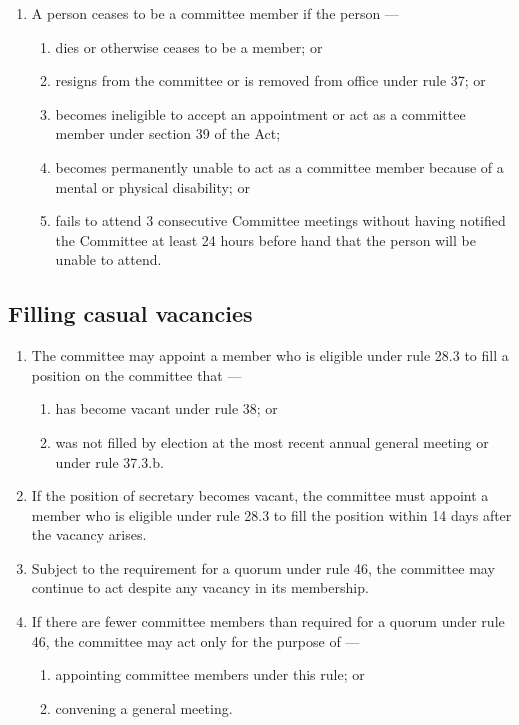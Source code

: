 \documentclass[../constitution.tex]{subfiles}
\begin{document}
\begin{enumerate}

\item A person ceases to be a committee member if the person ---

  \begin{enumerate}
  
  \item dies or otherwise ceases to be a member; or
  \item resigns from the committee or is removed from office under rule 37; or
  \item becomes ineligible to accept an appointment or act as a committee member under section 39 of the Act;
  \item becomes permanently unable to act as a committee member because of a mental or physical disability; or
  \item fails to attend 3 consecutive Committee meetings without having notified the Committee at least 24 hours before hand that the person will be unable to attend.
  \end{enumerate}
\end{enumerate}

\hypertarget{filling-casual-vacancies}{%
\subsection{Filling casual vacancies}\label{filling-casual-vacancies}}

\begin{enumerate}

\item The committee may appoint a member who is eligible under rule 28.3 to fill a position on the committee that ---

  \begin{enumerate}
  
  \item has become vacant under rule 38; or
  \item was not filled by election at the most recent annual general meeting or under rule 37.3.b.
  \end{enumerate}
\item If the position of secretary becomes vacant, the committee must appoint a member who is eligible under rule 28.3 to fill the position within 14 days after the vacancy arises.
\item Subject to the requirement for a quorum under rule 46, the committee may continue to act despite any vacancy in its membership.
\item If there are fewer committee members than required for a quorum under rule 46, the committee may act only for the purpose of ---

  \begin{enumerate}
  
  \item appointing committee members under this rule; or
  \item convening a general meeting.
  \end{enumerate}
\end{enumerate}
\end{document}
